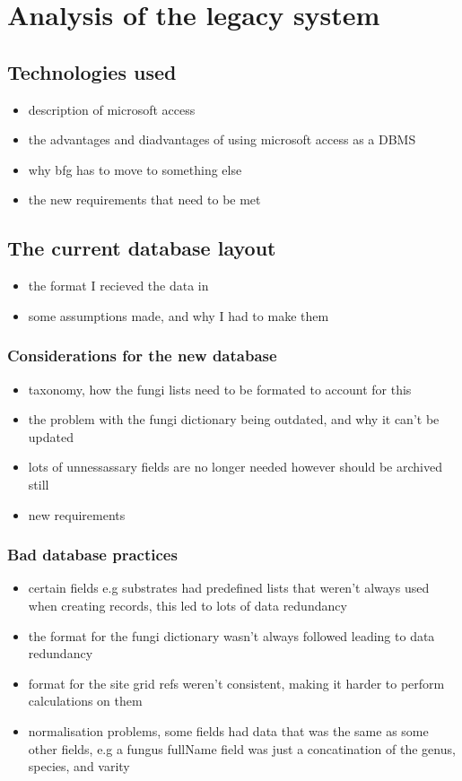 
\chapter{Analysis of the legacy system}

\section{Technologies used}
\begin{itemize}
\item description of microsoft access 
\item the advantages and diadvantages of using microsoft access as a DBMS
\item why bfg has to move to something else
\item the new requirements that need to be met
\end{itemize}

\section{The current database layout}
\begin{itemize}
\item the format I recieved the data in
\item some assumptions made, and why I had to make them
\end{itemize}

\subsection{Considerations for the new database}
\begin{itemize}
\item taxonomy, how the fungi lists need to be formated to account for this
\item the problem with the fungi dictionary being outdated, and why it can't be updated
\item lots of unnessassary fields are no longer needed however should be archived still
\item new requirements
\end{itemize}

\subsection{Bad database practices}
\begin{itemize}
\item certain fields e.g substrates had predefined lists that weren't always used when creating records, this led to lots of data redundancy
\item the format for the fungi dictionary wasn't always followed leading to data redundancy
\item format for the site grid refs weren't consistent, making it harder to perform calculations on them
\item normalisation problems, some fields had data that was the same as some other fields, e.g a fungus fullName field was just a concatination of the genus, species, and varity
\end{itemize}